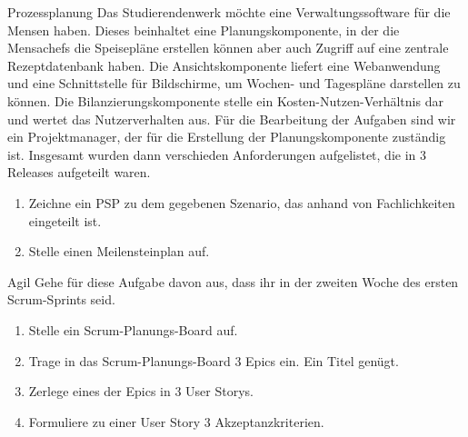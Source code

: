 \documentclass{article}
\begin{document}
\begin{exercise}{Prozessplanung}
  Das Studierendenwerk möchte eine Verwaltungssoftware für die Mensen haben. Dieses beinhaltet eine Planungskomponente, in der die Mensachefs die Speisepläne erstellen können aber auch Zugriff auf eine zentrale Rezeptdatenbank haben. Die Ansichtskomponente liefert eine Webanwendung und eine Schnittstelle für Bildschirme, um Wochen- und Tagespläne darstellen zu können. Die Bilanzierungskomponente stelle ein Kosten-Nutzen-Verhältnis dar und wertet das Nutzerverhalten aus. Für die Bearbeitung der Aufgaben sind wir ein Projektmanager, der für die Erstellung der Planungskomponente zuständig ist.
  Insgesamt wurden dann verschieden Anforderungen aufgelistet, die in 3 Releases aufgeteilt waren.

  \begin{enumerate}
    \item Zeichne ein PSP zu dem gegebenen Szenario, das anhand von Fachlichkeiten eingeteilt ist.
    \item Stelle einen Meilensteinplan auf.
  \end{enumerate}
\end{exercise}

\begin{exercise}{Agil}
  Gehe für diese Aufgabe davon aus, dass ihr in der zweiten Woche des ersten Scrum-Sprints seid.
  \begin{enumerate}
    \item Stelle ein Scrum-Planungs-Board auf.
    \item Trage in das Scrum-Planungs-Board 3 Epics ein. Ein Titel genügt.
    \item Zerlege eines der Epics in 3 User Storys.
    \item Formuliere zu einer User Story 3 Akzeptanzkriterien.
  \end{enumerate}
\end{exercise}
\end{document}
